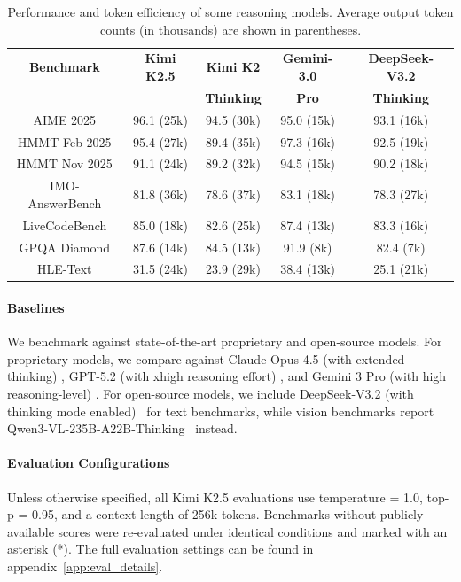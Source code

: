 \documentclass{article}
\newcommand{\citep}[1]{\parencite{#1}}
\begin{document}
\begin{table}[htbp]
\centering
\hspace{0.3cm}
\caption{Performance and token efficiency of some reasoning models. Average output token counts (in thousands) are shown in parentheses.}
\begin{tabular}{cc|ccc}
\toprule
\textbf{Benchmark} & \textbf{Kimi K2.5} & \textbf{Kimi K2} & \textbf{Gemini-3.0} & \textbf{DeepSeek-V3.2} \\
 &  & \textbf{Thinking} & \textbf{Pro} & \textbf{Thinking} \\
\midrule
AIME 2025 & 96.1 (25k) & 94.5 (30k) & 95.0 (15k) & 93.1 (16k) \\
HMMT Feb 2025 & 95.4 (27k) & 89.4 (35k) & 97.3 (16k) & 92.5 (19k) \\
HMMT Nov 2025 & 91.1 (24k) & 89.2 (32k) & 94.5 (15k) & 90.2 (18k) \\
IMO-AnswerBench & 81.8 (36k) & 78.6 (37k) & 83.1 (18k) & 78.3 (27k) \\
LiveCodeBench & 85.0 (18k) & 82.6 (25k) & 87.4 (13k) & 83.3 (16k) \\
GPQA Diamond & 87.6 (14k) & 84.5 (13k) & 91.9 (8k) & 82.4 (7k) \\
HLE-Text  & 31.5 (24k) & 23.9 (29k) & 38.4 (13k) & 25.1 (21k) \\
\bottomrule
\end{tabular}
\label{tab:k2.5-te}
\end{table}

\paragraph{Baselines}
We benchmark against state-of-the-art proprietary and open-source models. For proprietary models, we compare against Claude Opus 4.5 (with extended thinking) \citep{opus45report}, GPT-5.2 (with xhigh reasoning effort) \citep{gpt52report}, and Gemini 3 Pro (with high reasoning-level) \citep{gemini3pro}. For open-source models, we include DeepSeek-V3.2 (with thinking mode enabled)~\citep{deepseekai2025deepseekv32pushingfrontieropen} for text benchmarks, while vision benchmarks report Qwen3-VL-235B-A22B-Thinking~\citep{bai2025qwen3vltechnicalreport} instead.

\paragraph{Evaluation Configurations}
Unless otherwise specified, all Kimi K2.5 evaluations use temperature = 1.0, top-p = 0.95, and a context length of 256k tokens. Benchmarks without publicly available scores were re-evaluated under identical conditions and marked with an asterisk (*). The full evaluation settings can be found in appendix~\ref{app:eval_details}.
\end{document}
